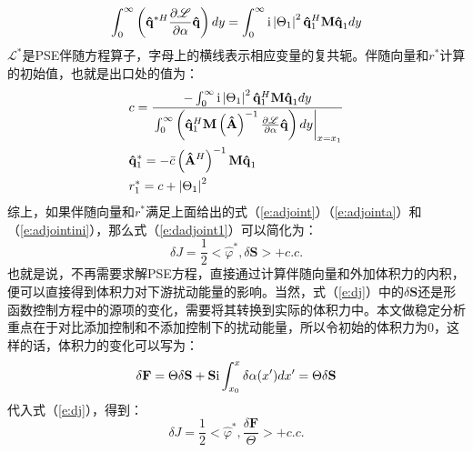 \begin{equation}
\label{e:adjointa}
\int_0^\infty  {\left( {\mathbf{\hat q} ^{*H} \frac{{\partial {\mathscr{L}}}}
{{\partial \alpha }}\mathbf{\hat q} } \right)dy}  = \int_0^\infty  {{\rm i}\left| {\Theta _1 } \right|^2 \mathbf{\hat q} _1 ^H \mathbf{M\hat q} _1 dy}
\end{equation}
$\mathscr{L}^*$是PSE伴随方程算子，字母上的横线表示相应变量的复共轭。伴随向量和$r^*$计算的初始值，也就是出口处的值为：
\begin{equation}
\label{e:adjointini}
\begin{gathered}
c = \frac{{ - \int_0^\infty  {{\rm i}\left| {\Theta _1 } \right|^2 {\mathbf{\hat q}}_1 ^H {\mathbf{M\hat q}}_1 dy} }}
{{\left. {\int_0^\infty  {\left( {{\mathbf{\hat q}}_1 ^H {\mathbf{M}}\left( {{\mathbf{\hat A}}} \right)^{ - 1} \frac{{\partial {\mathscr{L}}}}{{\partial \alpha }}{\mathbf{\hat q}}} \right)dy} } \right|_{x = x_1 } }} \hfill \\
{\mathbf{\hat q}}^* _1  =  - \bar c\left( {{\mathbf{\hat A}}^H } \right)^{ - 1} {\mathbf{M\hat q}}_1  \hfill \\
r_1^*  = c + \left| {\Theta _1 } \right|^2  \hfill \\
\end{gathered}
\end{equation}
综上，如果伴随向量和$r^*$满足上面给出的式（\ref{e:adjoint}）（\ref{e:adjointa}）和（\ref{e:adjointini}），那么式（\ref{e:dadjoint1}）可以简化为：
\begin{equation}
\label{e:dj}
\delta J = \frac{1}
{2} < \hat \varphi ^* ,\delta {\mathbf{S}} >  + c.c.
\end{equation}
也就是说，不再需要求解PSE方程，直接通过计算伴随向量和外加体积力的内积，便可以直接得到体积力对下游扰动能量的影响。当然，式（\ref{e:dj}）中的$\delta {\mathbf{S}}$还是形函数控制方程中的源项的变化，需要将其转换到实际的体积力中。本文做稳定分析重点在于对比添加控制和不添加控制下的扰动能量，所以令初始的体积力为0，这样的话，体积力的变化可以写为：
\begin{equation}
\label{e:df}
\delta {\mathbf{F}} = \Theta \delta {\mathbf{S}} + {\mathbf{S}}{\rm i}\int_{x_0 }^x {\delta \alpha (x')dx'}  = \Theta \delta {\mathbf{S}}
\end{equation}
代入式（\ref{e:dj}），得到：
\begin{equation}
\label{e:dj2}
\delta J = \frac{1}
{2} < \hat \varphi ^* ,\frac{{\delta {\mathbf{F}}}}
{\Theta } >  + c.c.
\end{equation}
